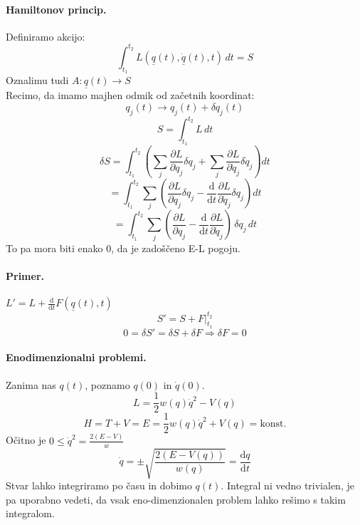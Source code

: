 \documentclass[a4paper]{article}
\newcommand{\pd}[2]{\frac{\partial {#1}}{\partial {#2}}}
\newcommand{\dd}[2]{\frac{\mathrm{d} {#1}}{\mathrm{d} {#2}}}
\begin{document}
\paragraph{Hamiltonov princip.} Definiramo akcijo:
$$\int_{t_1}^{t_2}L(\underline{q}(t), \underline{\dot{q}}(t), t)\,dt = S$$
Oznalimu tudi $A: \underline{q}(t) \to S$ \\[4mm]
Recimo, da imamo majhen odmik od začetnih koordinat:
$$q_j(t) \to q_j(t) + \delta q_j(t)$$
$$S = \int_{t_1}^{t_2} L\,dt$$
$$\delta S = \int_{t_1}^{t_2}\left(\sum_{j}\pd{L}{q_j}\delta q_j + \sum_j\pd{L}{\dot{q}_j}\delta\dot{q}_j\right)dt$$
$$= \int_{t_1}^{t_2}\sum_j\left(\pd{L}{q_j}\delta q_j - \dd{}{t}\pd{L}{\dot{q}_j}\delta q_j\right)dt$$
$$= \int_{t_1}^{t_2}\sum_j\left(\pd{L}{q_j} - \dd{}{t}\pd{L}{\dot{q}_j}\right)\,\delta q_j\,dt$$
To pa mora biti enako 0, da je zadoščeno E-L pogoju.
\paragraph{Primer.} $\displaystyle{L' = L + \dd{}{t}F(\underline{q}(t), t)}$
$$S' = S + F\Big|_{t_1}^{t_2}$$
$$0 = \delta S' = \delta S + \delta F \Rightarrow \delta F = 0$$
\paragraph{Enodimenzionalni problemi.} Zanima nas $q(t)$, poznamo $q(0)$ in $\dot{q}(0)$.
$$L = \frac{1}{2}w(q)\dot{q}^2 - V(q)$$
$$H = T + V = E = \frac{1}{2}w(q)\dot{q}^2 + V(q) = \text{konst.}$$
Očitno je $\displaystyle{0 \leq \dot{q}^2 = \frac{2(E-V)}{w}}$
$$\dot{q} = \pm \sqrt{\frac{2(E-V(q))}{w(q)}} = \dd{q}{t}$$
Stvar lahko integriramo po času in dobimo $q(t)$. Integral ni vedno trivialen, je pa uporabno vedeti, da vsak eno-dimenzionalen problem lahko rešimo s takim integralom.
\end{document}

